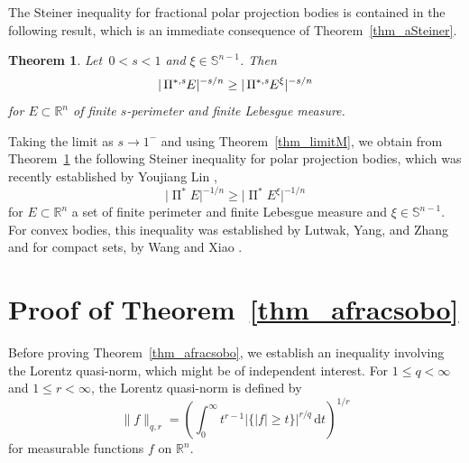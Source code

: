 \documentclass{amsart}
\newtheorem{theorem}{Theorem}
\newcommand{\opp}{\operatorname{\Pi}^*\!}
\newcommand{\ofpp}[1]{\operatorname{\Pi^{\ast,{\it #1}}}\!}
\newcommand{\snvtex}{{\mathbb S}^{n-1}}
\newcommand{\dvtex}{\,\mathrm{d}}
\newcommand{\vol}[1]{ \vert #1\vert}
\begin{document}
The Steiner inequality for fractional polar projection bodies is contained
in the following result, which is an immediate consequence of Theorem~\ref{thm_aSteiner}.

\begin{theorem}%
\label{thm_asSteiner}
Let $\,0<s<1$ and $\xi \in \snvtex $. Then
%
\begin{equation}
\vol{\ofpp{s} E}^{-s/n} \geq \vol{\ofpp{s} E^{\xi}}^{-s/n}
\nonumber \end{equation}
%
for $E\subset \mathbb R^{n}$ of finite $s$-perimeter and finite Lebesgue
measure.
\end{theorem}

\noindent
Taking the limit as $s\to 1^{-}$ and using Theorem~\ref{thm_limitM}, we
obtain from Theorem~\ref{thm_asSteiner} the following Steiner inequality
for polar projection bodies, which was recently established by Youjiang
Lin \cite{Lin21},
%
\begin{equation*}
\vol{\opp E}^{-1/n} \geq \vol{\opp E^{\xi}}^{-1/n}
\end{equation*}
%
for $E\subset \mathbb R^{n}$ a set of finite perimeter and finite Lebesgue
measure and $\xi \in \snvtex $. For convex bodies, this inequality was established
by Lutwak, Yang, and Zhang \cite{LYZ2000} and for compact sets, by Wang
and Xiao \cite{WangXiao}.

\section[Proof of Theorem 1]{Proof of Theorem~\ref{thm_afracsobo}}
\label{sec_isoperimetric}

Before proving Theorem~\ref{thm_afracsobo}, we establish an inequality
involving the Lorentz quasi-norm, which might be of independent interest.
For $1\leq q < \infty $ and $1 \leq r < \infty $, the Lorentz quasi-norm
is defined by
%
\begin{equation*}
\|f\|_{q,r} = \left ( \int _{0}^{\infty }t^{r-1} \big\vert \{|f| \ge t
\}\big\vert ^{r/q} \dvtex t \right )^{1/r}
\end{equation*}
%
for measurable functions $f$ on $\mathbb R^{n}$.
\end{document}
